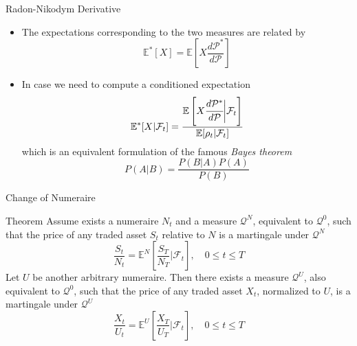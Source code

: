 \documentclass{beamer}
\begin{document}
\begin{frame}{Radon-Nikodym Derivative}
\begin{itemize}
	\item The expectations corresponding to the two measures are related by
	\begin{equation*}
		\mathbb{E}^*[X] = \mathbb{E}\left[X\frac{d\mathcal{P}^*}{d\mathcal{P}}\right]
	\end{equation*}
	\item In case we need to compute a conditioned expectation
	\begin{equation}
		\mathbb{E}^*[X|\mathcal{F}_t] = \frac{\mathbb{E}\left[X\cfrac{d\mathcal{P}^*}{d\mathcal{P}}\bigg|\mathcal{F}_t\right]}{\mathbb{E}[\rho_t|\mathcal{F}_t]}
		\label{eq:conditioned_expectation}
	\end{equation}
	which is an equivalent formulation of the famous \emph{Bayes theorem}
 	\begin{equation*}
		P(A|B)=\frac{P(B|A)P(A)}{P(B)}
	\end{equation*}
\end{itemize}
\end{frame}

\begin{frame}{Change of Numeraire}
	\begin{block}{Theorem}
	Assume exists a numeraire $N_t$ and a measure $\mathcal{Q}^N$, equivalent to $\mathcal{Q}^0$, such that the price of any traded asset $S_t$ relative to $N$ is a martingale under $\mathcal{Q}^N$
	\begin{equation*}
		\frac{S_t}{N_t} = \mathbb{E}^N\left[\frac{S_T}{N_T}\bigg|\mathcal{F}_t\right],\quad 0\le t \le T
	\end{equation*}
	Let $U$ be another arbitrary numeraire. Then there exists a measure $\mathcal{Q}^U$, also equivalent to $\mathcal{Q}^0$, such that the price of any traded asset $X_t$, normalized to $U$, is a martingale under $\mathcal{Q}^U$
	\begin{equation*}
		\frac{X_t}{U_t} = \mathbb{E}^U\left[\frac{X_T}{U_T}\bigg|\mathcal{F}_t\right],\quad 0\le t \le T
	\end{equation*}
	\end{block}
\end{frame}	
\end{document}
